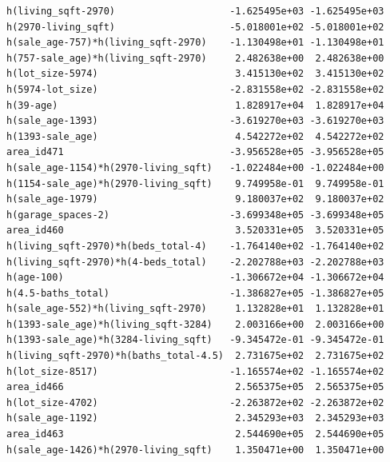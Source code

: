\documentclass[
]{article}
\begin{document}
\begin{verbatim}
h(living_sqft-2970)                    -1.625495e+03 -1.625495e+03
h(2970-living_sqft)                    -5.018001e+02 -5.018001e+02
h(sale_age-757)*h(living_sqft-2970)    -1.130498e+01 -1.130498e+01
h(757-sale_age)*h(living_sqft-2970)     2.482638e+00  2.482638e+00
h(lot_size-5974)                        3.415130e+02  3.415130e+02
h(5974-lot_size)                       -2.831558e+02 -2.831558e+02
h(39-age)                               1.828917e+04  1.828917e+04
h(sale_age-1393)                       -3.619270e+03 -3.619270e+03
h(1393-sale_age)                        4.542272e+02  4.542272e+02
area_id471                             -3.956528e+05 -3.956528e+05
h(sale_age-1154)*h(2970-living_sqft)   -1.022484e+00 -1.022484e+00
h(1154-sale_age)*h(2970-living_sqft)    9.749958e-01  9.749958e-01
h(sale_age-1979)                        9.180037e+02  9.180037e+02
h(garage_spaces-2)                     -3.699348e+05 -3.699348e+05
area_id460                              3.520331e+05  3.520331e+05
h(living_sqft-2970)*h(beds_total-4)    -1.764140e+02 -1.764140e+02
h(living_sqft-2970)*h(4-beds_total)    -2.202788e+03 -2.202788e+03
h(age-100)                             -1.306672e+04 -1.306672e+04
h(4.5-baths_total)                     -1.386827e+05 -1.386827e+05
h(sale_age-552)*h(living_sqft-2970)     1.132828e+01  1.132828e+01
h(1393-sale_age)*h(living_sqft-3284)    2.003166e+00  2.003166e+00
h(1393-sale_age)*h(3284-living_sqft)   -9.345472e-01 -9.345472e-01
h(living_sqft-2970)*h(baths_total-4.5)  2.731675e+02  2.731675e+02
h(lot_size-8517)                       -1.165574e+02 -1.165574e+02
area_id466                              2.565375e+05  2.565375e+05
h(lot_size-4702)                       -2.263872e+02 -2.263872e+02
h(sale_age-1192)                        2.345293e+03  2.345293e+03
area_id463                              2.544690e+05  2.544690e+05
h(sale_age-1426)*h(2970-living_sqft)    1.350471e+00  1.350471e+00
                                                                  

\end{verbatim}
\end{document}
